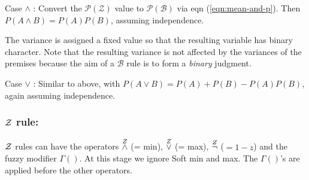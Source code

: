 Case $\wedge$ : Convert the $\mathcal{P(Z)}$ value to $\mathcal{P(B)}$ via eqn (\ref{eqn:mean-and-p}).  Then $P(A \wedge B) = P(A) P(B)$, assuming independence.

The variance is assigned a fixed value so that the resulting variable has binary character.  Note that the resulting variance is not affected by the variances of the premises because the aim of a $\mathcal{B}$ rule is to form a \textit{binary} judgment.

Case $\vee$ : Similar to above, with $P(A \vee B) = P(A) + P(B) - P(A)P(B)$, again assuming independence.

\subsubsection{$\mathcal{Z}$ rule:}

$\mathcal{Z}$ rules can have the operators $\stackrel{Z}{\wedge}$ (= min), $\stackrel{Z}{\vee}$ (= max), $\stackrel{Z}{\neg}$ ($= 1-z$) and the fuzzy modifier $\Gamma()$.  At this stage we ignore Soft min and max.  The $\Gamma()$'s are applied before the other operators.

